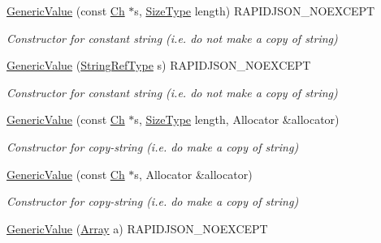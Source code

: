 \begin{DoxyCompactItemize}
\mbox{\label{a01992_a4d9af98141360cd801daab4ed1ca2c91}} 
\hyperlink{a01992_a4d9af98141360cd801daab4ed1ca2c91}{Generic\+Value} (const \hyperlink{a01992_ade0e0ce64ccd5d852da57a35e720bafb}{Ch} $\ast$s, \hyperlink{a00560_a5ed6e6e67250fadbd041127e6386dcb5}{Size\+Type} length) R\+A\+P\+I\+D\+J\+S\+O\+N\+\_\+\+N\+O\+E\+X\+C\+E\+PT
\begin{DoxyCompactList}\small\item\em Constructor for constant string (i.\+e. do not make a copy of string) \end{DoxyCompactList}\item 
\mbox{\label{a01992_abb2887958974fef1b2b5c8e32cc72ddb}} 
\hyperlink{a01992_abb2887958974fef1b2b5c8e32cc72ddb}{Generic\+Value} (\hyperlink{a01992_a32e0f30ee278072374c8168b14d3317f}{String\+Ref\+Type} s) R\+A\+P\+I\+D\+J\+S\+O\+N\+\_\+\+N\+O\+E\+X\+C\+E\+PT
\begin{DoxyCompactList}\small\item\em Constructor for constant string (i.\+e. do not make a copy of string) \end{DoxyCompactList}\item 
\mbox{\label{a01992_a9ec2c7cda8c8845acfa3565c6b1b4e10}} 
\hyperlink{a01992_a9ec2c7cda8c8845acfa3565c6b1b4e10}{Generic\+Value} (const \hyperlink{a01992_ade0e0ce64ccd5d852da57a35e720bafb}{Ch} $\ast$s, \hyperlink{a00560_a5ed6e6e67250fadbd041127e6386dcb5}{Size\+Type} length, Allocator \&allocator)
\begin{DoxyCompactList}\small\item\em Constructor for copy-\/string (i.\+e. do make a copy of string) \end{DoxyCompactList}\item 
\mbox{\label{a01992_a9b72b2e3347d4cd77b16c3b45e8decf1}} 
\hyperlink{a01992_a9b72b2e3347d4cd77b16c3b45e8decf1}{Generic\+Value} (const \hyperlink{a01992_ade0e0ce64ccd5d852da57a35e720bafb}{Ch} $\ast$s, Allocator \&allocator)
\begin{DoxyCompactList}\small\item\em Constructor for copy-\/string (i.\+e. do make a copy of string) \end{DoxyCompactList}\item 
\hyperlink{a01992_a953052ef91e54aabe9bdb9f9eaebf6cc}{Generic\+Value} (\hyperlink{a02076}{Array} a) R\+A\+P\+I\+D\+J\+S\+O\+N\+\_\+\+N\+O\+E\+X\+C\+E\+PT

\end{DoxyCompactItemize}
